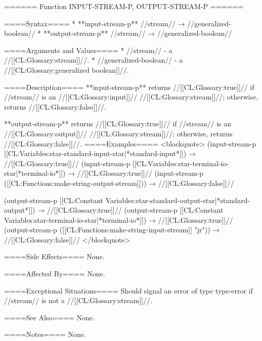 ====== Function INPUT-STREAM-P, OUTPUT-STREAM-P ======

====Syntax====
  * **input-stream-p** //stream// → //generalized-boolean// 
  * **output-stream-p** //stream// → //generalized-boolean//

====Arguments and Values====
  * //stream// - a //[[CL:Glossary:stream]]//.
  * //generalized-boolean// - a //[[CL:Glossary:generalized boolean]]//.

====Description====
**input-stream-p** returns //[[CL:Glossary:true]]// if //stream// is an //[[CL:Glossary:input]]// //[[CL:Glossary:stream]]//; otherwise, returns //[[CL:Glossary:false]]//.

**output-stream-p** returns //[[CL:Glossary:true]]// if //stream// is an //[[CL:Glossary:output]]// //[[CL:Glossary:stream]]//; otherwise, returns //[[CL:Glossary:false]]//. 
====Examples====
<blockquote>
(input-stream-p [[CL:Variables:star-standard-input-star|*standard-input*]]) → //[[CL:Glossary:true]]// 
(input-stream-p [[CL:Variables:star-terminal-io-star|*terminal-io*]]) → //[[CL:Glossary:true]]// 
(input-stream-p ([[CL:Functions:make-string-output-stream]])) → //[[CL:Glossary:false]]//

(output-stream-p [[CL:Constant Variables:star-standard-output-star|*standard-output*]]) → //[[CL:Glossary:true]]// 
(output-stream-p [[CL:Constant Variables:star-terminal-io-star|*terminal-io*]]) → //[[CL:Glossary:true]]// 
(output-stream-p ([[CL:Functions:make-string-input-stream]] "jr")) → //[[CL:Glossary:false]]// 
</blockquote>

====Side Effects====
None.

====Affected By====
None.

====Exceptional Situations====
Should signal an error of type type-error if //stream// is not a //[[CL:Glossary:stream]]//.

====See Also====
None.

====Notes====
None.

